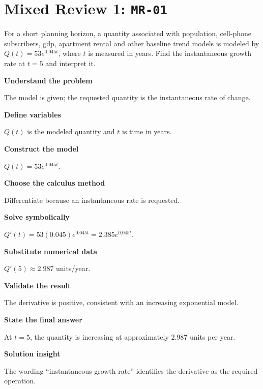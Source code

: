 \documentclass[11pt]{book}
\newcommand{\pid}[1]{\texttt{#1}}
\begin{document}
\section*{Mixed Review 1: \pid{MR-01}}
\begin{problembox}For a short planning horizon, a quantity associated with population, cell-phone subscribers, gdp, apartment rental and other baseline trend models is modeled by $Q(t)=53e^{0.045t}$, where $t$ is measured in years. Find the instantaneous growth rate at $t=5$ and interpret it.\end{problembox}
\begin{solutionbox}
\textbf{Understand the problem}\par The model is given; the requested quantity is the instantaneous rate of change.\par\medskip
\textbf{Define variables}\par $Q(t)$ is the modeled quantity and $t$ is time in years.\par\medskip
\textbf{Construct the model}\par $Q(t)=53e^{0.045t}$.\par\medskip
\textbf{Choose the calculus method}\par Differentiate because an instantaneous rate is requested.\par\medskip
\textbf{Solve symbolically}\par $Q'(t)=53(0.045)e^{0.045t}=2.385e^{0.045t}$.\par\medskip
\textbf{Substitute numerical data}\par $Q'(5)\approx 2.987$ units/year.\par\medskip
\textbf{Validate the result}\par The derivative is positive, consistent with an increasing exponential model.\par\medskip
\textbf{State the final answer}\par At $t=5$, the quantity is increasing at approximately $2.987$ units per year.\par\medskip
\textbf{Solution insight}\par The wording “instantaneous growth rate” identifies the derivative as the required operation.\par\medskip
\end{solutionbox}
\end{document}
